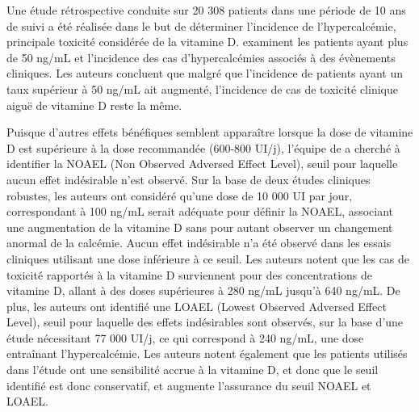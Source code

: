 \documentclass[
  a4paper,
  DIV=11,
  numbers=noendperiod,
  listof=totoc]{scrreprt}
\begin{document}
Une étude rétrospective conduite sur 20 308 patients dans une période de
10 ans de suivi a été réalisée dans le but de déterminer l'incidence de
l'hypercalcémie, principale toxicité considérée de la vitamine D.
\textcite{Dudenkov.2015} examinent les patients ayant plus de 50 ng/mL
et l'incidence des cas d'hypercalcémies associés à des évènements
cliniques. Les auteurs concluent que malgré que l'incidence de patients
ayant un taux supérieur à 50 ng/mL ait augmenté, l'incidence de cas de
toxicité clinique aiguë de vitamine D reste la même.

Puisque d'autres effets bénéfiques semblent apparaître lorsque la dose
de vitamine D est supérieure à la dose recommandée (600-800 UI/j),
l'équipe de \textcite{Hathcock.2007} a cherché à identifier la NOAEL
(Non Observed Adversed Effect Level), seuil pour laquelle aucun effet
indésirable n'est observé. Sur la base de deux études cliniques
robustes, les auteurs ont considéré qu'une dose de 10 000 UI par jour,
correspondant à 100 ng/mL serait adéquate pour définir la NOAEL,
associant une augmentation de la vitamine D sans pour autant observer un
changement anormal de la calcémie. Aucun effet indésirable n'a été
observé dans les essais cliniques utilisant une dose inférieure à ce
seuil. Les auteurs notent que les cas de toxicité rapportés à la
vitamine D surviennent pour des concentrations de vitamine D, allant à
des doses supérieures à 280 ng/mL jusqu'à 640 ng/mL. De plus, les
auteurs ont identifié une LOAEL (Lowest Observed Adversed Effect Level),
seuil pour laquelle des effets indésirables sont observés, sur la base
d'une étude nécessitant 77 000 UI/j, ce qui correspond à 240 ng/mL, une
dose entraînant l'hypercalcémie. Les auteurs notent également que les
patients utilisés dans l'étude ont une sensibilité accrue à la vitamine
D, et donc que le seuil identifié est donc conservatif, et augmente
l'assurance du seuil NOAEL et LOAEL.
\end{document}

